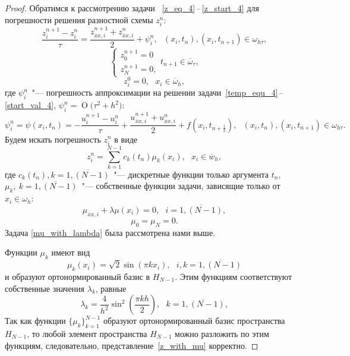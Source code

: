 \documentclass[11pt,a4paper,twoside,listtotoc,bibtotoc]{report}
\numberwithin{equation}{section}
\theoremstyle{definition}
\theoremstyle{plain}
\newcommand{\bigO}[1]{\ensuremath{\operatorname{O}\bigl(#1\bigr)}}
\begin{document}
\begin{proof}
%
Обратимся к рассмотрению задачи ~\eqref{z_eq_4}\,--\,\eqref{z_start_4}
для погрешности решения разностной схемы $z_i^n$:
\begin{equation}
    \frac{z_i^{n+1} - z_i^n}{\tau} = \frac{z^{n+1}_{\overline{x}x,i} +
    z^{n}_{\overline{x}x,i}}{2} + \psi_i^n,~~~(x_i, t_n), (x_i, t_{n+1})\in \omega_{h \tau},
\end{equation}
%
\begin{equation}
    \begin{cases}
        z_0^{n+1} = 0 \\
        z_N^{n+1} = 0,
    \end{cases}
    t_{n+1}\in \overline{\omega}_{\tau},
\end{equation}
%
\begin{equation}
    z_i^0 = 0,~~~x_i\in \overline{\omega}_h,
\end{equation}
%
где $\psi_i^n$~"--- погрешность аппроксимации на решении
задачи~\eqref{temp_equ_4}\,--\,\eqref{start_val_4}, $\psi_i^n = \bigO{\tau^2 + h^2}$:
%
\begin{equation}
%
    \psi_i^n = \psi(x_i, t_n) = -\frac{u_i^{n+1} - u_i^n}{\tau} + \frac{u^{n+1}_{\overline{x}x,i}
    + u^{n}_{\overline{x}x,i}}{2} + f(x_i, t_{n+\frac{1}{2}}),
    ~~~(x_i, t_n), (x_i, t_{n+1})\in \omega_{h\tau}.
%
\end{equation}
Будем искать погрешность $z_i^n$ в виде
%
\begin{equation}
%
    \label{z_with_mu}
    z_i^n = \sum_{k=1}^{N-1} c_k(t_n)\mu_k(x_i), ~~~x_i \in \overline{w}_h,
%
\end{equation}
%
где $c_k(t_n), k=\overline{1,(N-1)}$~"--- дискретные функции только аргумента $t_n$,
$\mu_k,~k=\overline{1,(N-1)}$~"--- собственные функции задачи, зависящие только от
$x_i \in \omega_h$:
%
\begin{equation}
%
    \label{mu_with_lambda}
    \mu_{\overline{x}x,i} + \lambda \mu(x_i) = 0, ~~~i=\overline{1, (N-1)},
%
\end{equation}
%
$$
    \mu_0 = \mu_N = 0.
$$
%
Задача \eqref{mu_with_lambda} была рассмотрена нами выше.

Функции $\mu_k$ имеют вид
%
$$
    \mu_k(x_i) = \sqrt{2} \sin(\pi kx_i), ~~~i,k = \overline{1, (N-1)}
$$
%
и образуют ортонормированный базис в $H_{N-1}$.
Этим функциям соответствуют собственные значения $\lambda_k$, равные
%
$$
    \lambda_k = \frac{4}{h^2} \sin^2\left(\frac{\pi k h}{2}\right), ~~~k = \overline{1, (N-1)},
$$
%
Так как функции $\{\mu_k\}_{k=1}^{N-1}$ образуют ортонормированный базис
пространства $H_{N-1}$, то любой элемент пространства $H_{N-1}$ можно разложить
по этим функциям, следовательно, представление~\eqref{z_with_mu} корректно.


\end{proof}
\end{document}
